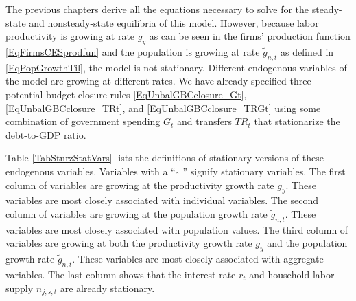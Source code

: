 
The previous chapters derive all the equations necessary to solve for the steady-state and nonsteady-state equilibria of this model. However, because labor productivity is growing at rate $g_y$ as can be seen in the firms' production function \eqref{EqFirmsCESprodfun} and the population is growing at rate $\tilde{g}_{n,t}$ as defined in \eqref{EqPopGrowthTil}, the model is not stationary. Different endogenous variables of the model are growing at different rates. We have already specified three potential budget closure rules \eqref{EqUnbalGBCclosure_Gt}, \eqref{EqUnbalGBCclosure_TRt}, and \eqref{EqUnbalGBCclosure_TRGt} using some combination of government spending $G_t$ and transfers $TR_t$ that stationarize the debt-to-GDP ratio.

Table \ref{TabStnrzStatVars} lists the definitions of stationary versions of these endogenous variables. Variables with a ``$\:\,\hat{}\,\:$'' signify stationary variables. The first column of variables are growing at the productivity growth rate $g_y$. These variables are most closely associated with individual variables. The second column of variables are growing at the population growth rate $\tilde{g}_{n,t}$. These variables are most closely associated with population values. The third column of variables are growing at both the productivity growth rate $g_y$ and the population growth rate $\tilde{g}_{n,t}$. These variables are most closely associated with aggregate variables. The last column shows that the interest rate $r_t$ and household labor supply $n_{j,s,t}$ are already stationary.


